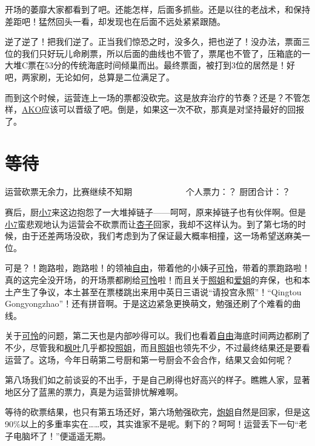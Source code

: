 开场的萎靡大家都看到了吧。还能怎样，后面多抓些。还是以往的老战术，和保持差距吧！猛然回头一看，却发现也在后面不远处紧紧跟随。

逆了逆了！把我们逆了。正当我们惊恐之时，没多久，把也逆了！没办法，票面三位的我们只好玩儿命刷票，所以后面的曲线也不管了，票尾也不管了，压箱底的一大堆C票在53分的传统海底时间倾巢而出。最终票面，被打到3位的居然是！好吧，两家刷，无论如何，总算是二位满足了。

而到这个时候，运营连上一场的票都没砍完。这是放弃治疗的节奏？还是？不管怎样，\uline{AKO}应该可以晋级了吧。倒是，如果这一次不砍，那真是对坚持最好的回报了。

\chapter{等待}
\begin{center}
{\subTitle 运营砍票无余力，比赛继续不知期}
\subMemo
　　　　　　个人票力：？ 厨团合计：？
\end{center}

赛后，厨\uline{小7}来这边抱怨了一大堆掉链子——呵呵，原来掉链子也有伙伴啊。但是\uline{小7}蛮悲观地认为运营会不砍票而让\uline{杏子}回家，我却不这样认为。到了第七场的时候，由于还差两场没砍，我们考虑到为了保证最大概率相撞，这一场希望送麻美一位。

可是？！跑路啦，跑路啦！的领袖\uline{自由}，带着他的小姨子\uline{可怜}，带着的票跑路啦！真的这完全没开场，的开场票都刷给\uline{可怜}啦！而且关于\uline{照姐}和\uline{爱姐}的弃保，也和本土产生了争议，本土甚至在票楼跳出来用中英日三语说“请投宫永照”！“Qingtou Gongyongzhao”！还有拼音啊。于是这边紧急更换萌文，勉强还刷了个难看的曲线。

关于\uline{可怜}的问题，第二天也是内部吵得可以。我们也看着\uline{自由}海底时间两边都刷了不少，尽管我和\uline{枫叶}几乎都投\uline{照姐}，而且\uline{照姐}也领先不少，不过最终结果还是要看运营了。这场，今年日萌第二号厨和第一号厨会不会合作，结果又会如何呢？

第八场我们如之前谈妥的不出手，于是自己刷得也好高兴的样子。瞧瞧人家，显著地区分了蓝黑的票力，真是为运营排忧解难啊。

等待的砍票结果，也只有第五场还好，第六场勉强砍完，\uline{炮姐}自然是回家，但是这90\%以上的多重率实在……哎，其实谁家不是呢。剩下的？呵呵！运营丢下一句“老子电脑坏了！”便遥遥无期。

